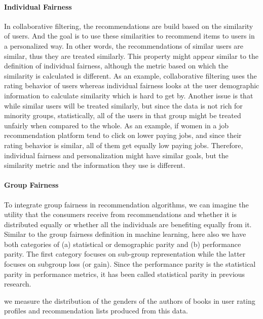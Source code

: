 \paragraph{Individual Fairness}
In collaborative filtering, the recommendations are build based on the similarity of users. And the goal is to use these similarities to recommend items to users in a personalized way. In other words, the recommendations of similar users are similar, thus they are treated similarly. This property might appear similar to the definition of individual fairness, although the metric based on which the similarity is calculated is different. As an example,
collaborative filtering uses the rating behavior of users whereas individual fairness looks at the user demographic information to calculate similarity which is hard to get by.
Another issue is that while similar users will be treated similarly, but since the data is not rich for minority groups, statistically, all of the users in that group might be treated unfairly when compared to the whole.
As an example, if women in a job recommendation platform tend to click on lower paying jobs, and since their rating behavior is similar, all of them get equally low paying jobs. Therefore, individual fairness and personalization might have similar goals, but the similarity metric and the information they use is different.


\paragraph{Group Fairness}
To integrate group fairness in recommendation algorithms, we can imagine the utility that the consumers receive from recommendations and whether it is distributed equally or whether all the individuals are benefiting equally from it. Similar to the group fairness definition in machine learning, here also we have both categories of (a) statistical or demographic parity and (b) performance parity. The first category focuses on sub-group representation while the latter focuses on subgroup loss (or gain). Since the performance parity is the statistical parity in performance metrics, it has been called statistical parity in previous research.

we measure the distribution of the genders of the authors of books in user rating profiles and recommendation lists produced from this data.

